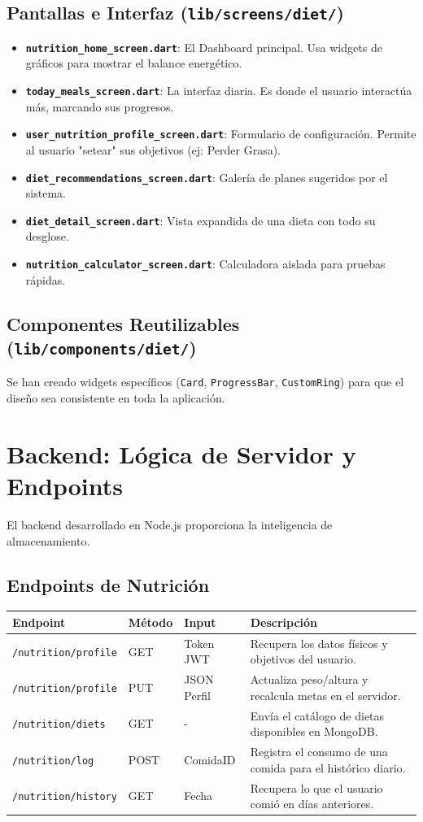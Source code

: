 \documentclass[12pt,a4paper]{article}
\begin{document}
\subsection{Pantallas e Interfaz (\texttt{lib/screens/diet/})}
\begin{itemize}
    \item \textbf{\texttt{nutrition\_home\_screen.dart}}: El Dashboard principal. Usa widgets de gráficos para mostrar el balance energético.
    \item \textbf{\texttt{today\_meals\_screen.dart}}: La interfaz diaria. Es donde el usuario interactúa más, marcando sus progresos.
    \item \textbf{\texttt{user\_nutrition\_profile\_screen.dart}}: Formulario de configuración. Permite al usuario "setear" sus objetivos (ej: Perder Grasa).
    \item \textbf{\texttt{diet\_recommendations\_screen.dart}}: Galería de planes sugeridos por el sistema.
    \item \textbf{\texttt{diet\_detail\_screen.dart}}: Vista expandida de una dieta con todo su desglose.
    \item \textbf{\texttt{nutrition\_calculator\_screen.dart}}: Calculadora aislada para pruebas rápidas.
\end{itemize}

\subsection{Componentes Reutilizables (\texttt{lib/components/diet/})}
Se han creado widgets específicos (\texttt{Card}, \texttt{ProgressBar}, \texttt{CustomRing}) para que el diseño sea consistente en toda la aplicación.

\section{Backend: Lógica de Servidor y Endpoints}
El backend desarrollado en Node.js proporciona la inteligencia de almacenamiento.

\subsection{Endpoints de Nutrición}
\begin{longtable}{@{}lllp{6cm}@{}}
\toprule
\textbf{Endpoint} & \textbf{Método} & \textbf{Input} & \textbf{Descripción} \\ \midrule
\texttt{/nutrition/profile} & GET & Token JWT & Recupera los datos físicos y objetivos del usuario. \\
\texttt{/nutrition/profile} & PUT & JSON Perfil & Actualiza peso/altura y recalcula metas en el servidor. \\
\texttt{/nutrition/diets} & GET & - & Envía el catálogo de dietas disponibles en MongoDB. \\
\texttt{/nutrition/log} & POST & ComidaID & Registra el consumo de una comida para el histórico diario. \\
\texttt{/nutrition/history} & GET & Fecha & Recupera lo que el usuario comió en días anteriores. \\ \bottomrule
\end{longtable}
\end{document}
